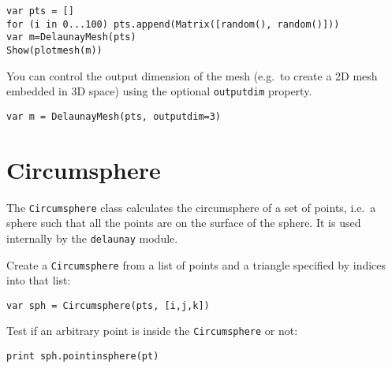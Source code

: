 \begin{lstlisting}
var pts = []
for (i in 0...100) pts.append(Matrix([random(), random()]))
var m=DelaunayMesh(pts)
Show(plotmesh(m))
\end{lstlisting}

You can control the output dimension of the mesh (e.g.~to create a 2D
mesh embedded in 3D space) using the optional \texttt{outputdim}
property.

\begin{lstlisting}
var m = DelaunayMesh(pts, outputdim=3)
\end{lstlisting}

\hypertarget{circumsphere}{%
\section{Circumsphere}\label{circumsphere}}

The \texttt{Circumsphere} class calculates the circumsphere of a set of
points, i.e.~a sphere such that all the points are on the surface of the
sphere. It is used internally by the \texttt{delaunay} module.

Create a \texttt{Circumsphere} from a list of points and a triangle
specified by indices into that list:

\begin{lstlisting}
var sph = Circumsphere(pts, [i,j,k]) 
\end{lstlisting}

Test if an arbitrary point is inside the \texttt{Circumsphere} or not:

\begin{lstlisting}
print sph.pointinsphere(pt)
\end{lstlisting}

